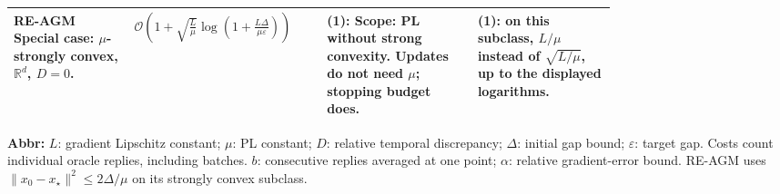 \begin{table}[tp]
\begin{threeparttable}
\begin{tabularx}{\linewidth}{@{}>{\raggedright\arraybackslash}p{0.20\linewidth}>{\raggedright\arraybackslash}p{0.32\linewidth}>{\raggedright\arraybackslash}p{0.25\linewidth}>{\raggedright\arraybackslash}X@{}}
\midrule
RE-AGM \citep[Thm.~4]{vasinEtAl2025RelativeV3}
\newline Special case: $\mu$-strongly convex, $\mathbb{R}^d$, $D=0$.
& $\mathcal{O}\!\left(1+\sqrt{\frac{L}{\mu}}\log\left(1+\frac{L\Delta}{\mu\varepsilon}\right)\right)$
& \textbf{(1)}: Scope: PL without strong convexity. Updates do not need $\mu$; stopping budget does.
& \textbf{(1)}: on this subclass, $L/\mu$ instead of $\sqrt{L/\mu}$, up to the displayed logarithms. \\
\bottomrule
\end{tabularx}
\begin{tablenotes}[flushleft]\footnotesize
\item[] \textbf{Abbr:} $L$: gradient Lipschitz constant; $\mu$: PL constant; $D$: relative temporal discrepancy; $\Delta$: initial gap bound; $\varepsilon$: target gap. Costs count individual oracle replies, including batches. $b$: consecutive replies averaged at one point; $\alpha$: relative gradient-error bound. RE-AGM uses $\|x_0-x_\star\|^2\le2\Delta/\mu$ on its strongly convex subclass.
\end{tablenotes}
\end{threeparttable}
\end{table}
\clearpage
